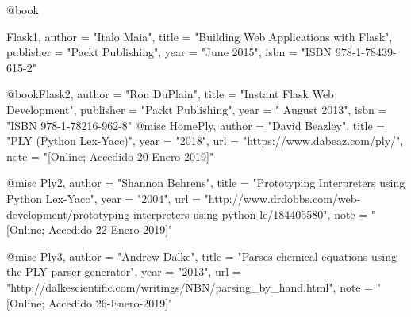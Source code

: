 @book{Flask1,
		author    = "Italo Maia",
		title     = "Building Web Applications  with Flask",
		publisher = "Packt Publishing",
		year      = "June 2015",
		isbn      = "ISBN 978-1-78439-615-2"

		
}
@book{Flask2,
		author    = "Ron DuPlain",
		title     = "Instant Flask Web Development",
		publisher = "Packt Publishing",
		year      = " August 2013",
		isbn      = "ISBN 978-1-78216-962-8"
}
@misc{ HomePly,
       author = "David Beazley",
       title = "PLY (Python Lex-Yacc)",
       year = "2018",
       url = "https://www.dabeaz.com/ply/",
       note = "[Online; Accedido 20-Enero-2019]"
}

@misc{ Ply2,
       author = "Shannon Behrens",
       title = "Prototyping Interpreters using Python Lex-Yacc",
       year = "2004",
       url = "http://www.drdobbs.com/web-development/prototyping-interpreters-using-python-le/184405580",
       note = "[Online; Accedido 22-Enero-2019]"
}

@misc{ Ply3,
       author = "Andrew Dalke",
       title = "Parses chemical equations using the PLY parser generator",
       year = "2013",
       url = "http://dalkescientific.com/writings/NBN/parsing_by_hand.html",
       note = "[Online; Accedido 26-Enero-2019]"
}